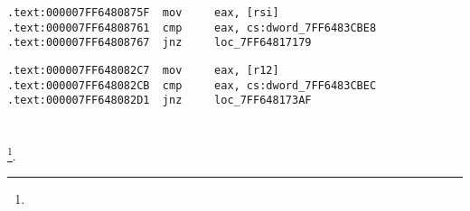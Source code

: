 \begin{lstlisting}[caption=dhcpcore.dll (Windows 7 x64)]
.text:000007FF6480875F  mov     eax, [rsi]
.text:000007FF64808761  cmp     eax, cs:dword_7FF6483CBE8
.text:000007FF64808767  jnz     loc_7FF64817179
\end{lstlisting}


\begin{lstlisting}[caption=dhcpcore.dll (Windows 7 x64)]
.text:000007FF648082C7  mov     eax, [r12]
.text:000007FF648082CB  cmp     eax, cs:dword_7FF6483CBEC
.text:000007FF648082D1  jnz     loc_7FF648173AF
\end{lstlisting}

\section{}

\footnote{\BGREPURL}.
